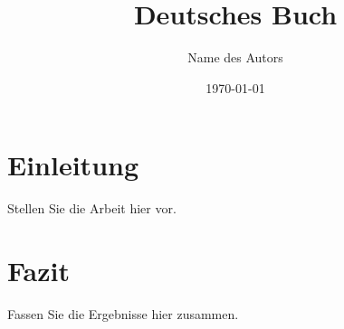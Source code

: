\documentclass[11pt]{book}
\title{Deutsches Buch}
\author{Name des Autors}
\date{\today}
\begin{document}
\maketitle
\tableofcontents

\chapter{Einleitung}
Stellen Sie die Arbeit hier vor.

\chapter{Fazit}
Fassen Sie die Ergebnisse hier zusammen.
\end{document}
